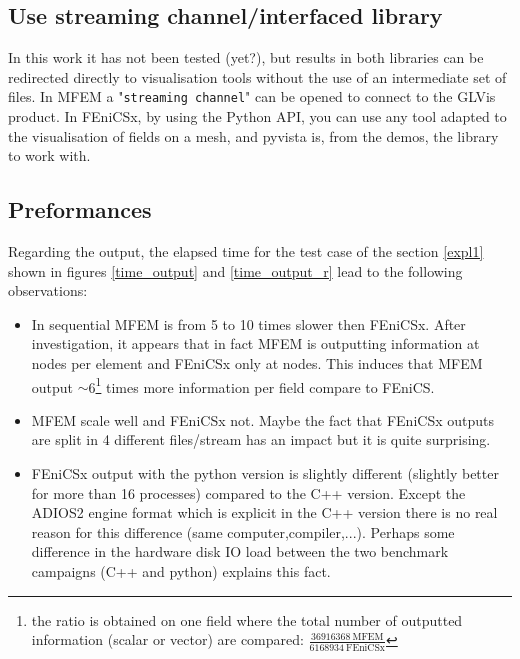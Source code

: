 \documentclass[12pt]{article}
\newcommand{\f}[1]{FEniCSx#1}
\newcommand{\mycode}[1]{\textsf{"}\lstinline`#1`\textsf{"}}
\begin{document}
\subsection{Use streaming channel/interfaced library}
In this work it has not been tested (yet?), but results in both libraries can be redirected directly to visualisation tools without the use of an intermediate set of files.
In MFEM a \mycode{streaming channel} can be opened to connect to the GLVis product. 
In \f{}, by using the Python API, you can use any tool adapted to the visualisation of fields on a mesh, and pyvista is, from the demos, the library to work with.
\subsection{Preformances}
Regarding the output, the elapsed time for the test case of the section \ref{expl1} shown in figures \ref{time_output} and \ref{time_output_r} lead to the following observations:
\begin{itemize}
	\item In sequential MFEM is from 5 to 10 times slower then \f{}. After investigation, it appears that in fact MFEM is outputting information at nodes per element and \f{} only at nodes. This induces that MFEM output $\sim$6\footnote{the ratio is obtained on one field where the total number of outputted information (scalar or vector) are compared: $\frac{36916368 ~\text{MFEM}}{6168934 ~\text{\f{}}}$}  times more information per field compare to FEniCS. 
	\item MFEM scale well and \f{} not. Maybe the fact that \f{} outputs are split in 4 different files/stream has an impact but it is quite surprising.
	\item \f{} output with the python version is slightly different (slightly better for more than 16 processes) compared to the C++ version.
	Except the ADIOS2 engine format which is explicit in the C++ version there is no real reason for this difference (same computer,compiler,...).
	Perhaps some difference in the hardware disk IO load between the two benchmark campaigns (C++ and python) explains this fact.
\end{itemize}
\end{document}
